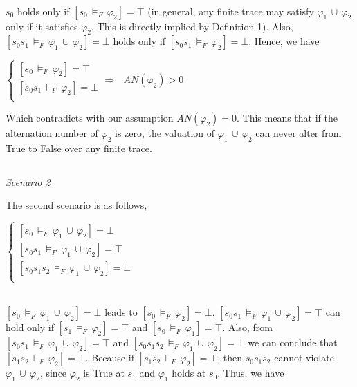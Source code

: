 ~~
  
$s_0$ holds only if $[s_0 \, \models_F \, \varphi_2] = \top$ (in general, any finite trace may satisfy $\varphi_1 \, \cup \, \varphi_2$ only if it satisfies $\varphi_2$. This is directly implied by Definition 1).  Also, $[s_0 s_1 \, \models_F \,  \varphi_1 \, \cup \, \varphi_2] = \bot$ holds only if $[s_0 s_1 \, \models_F \, \varphi_2] = \bot$. Hence, we have  
~~~
 \begin{center}
$
  \left.
  \begin{cases}
    [s_0 \, \models_F \, \varphi_2] = \top \\
    [s_0 s_1 \, \models_F \, \varphi_2] = \bot \\
  \end{cases}
  \right. 
\Longrightarrow     ~~~   AN(\varphi_2) > 0
$
\end{center}
  
  Which contradicts with our assumption $AN(\varphi_2) = 0$. This means that if the alternation number of $\varphi_2$ is zero, the valuation of $\varphi_1 \, \cup \, \varphi_2$ can never alter from True to False over any finite trace. 


\subsection*{}

\textit{Scenario 2}

The second scenario is as follows,
~~~
 \begin{center}
 
$  \left.
  \begin{cases}
    [s_0 \, \models_F \, \varphi_1 \, \cup \, \varphi_2] = \bot \\
    [s_0 s_1 \, \models_F \, \varphi_1 \, \cup \, \varphi_2] = \top \\
    [s_0 s_1 s_2\, \models_F \, \varphi_1 \, \cup \, \varphi_2] = \bot \\
  \end{cases}
  \right.
  $
\end{center}
~~~ \\
 $[s_0 \, \models_F \, \varphi_1 \, \cup \, \varphi_2] = \bot$ leads to $ [s_0 \, \models_F \, \varphi_2] = \bot $. 
 $[s_0 s_1 \, \models_F \, \varphi_1 \, \cup \, \varphi_2] = \top$ can hold only if $ [s_1 \, \models_F \, \varphi_2] = \top $ and $ [s_0 \, \models_F \, \varphi_1] = \top$. 
Also, from $ [s_0 s_1 \, \models_F \, \varphi_1 \, \cup \, \varphi_2] = \top$ and $ [s_0 s_1 s_2\, \models_F \, \varphi_1 \, \cup \, \varphi_2] = \bot $ we can conclude that $[s_1 s_2\, \models_F \, \varphi_2] = \bot$. Because if $[s_1 s_2\, \models_F \, \varphi_2] = \top$, then $s_0s_1s_2$ cannot violate $\varphi_1 \, \cup \, \varphi_2$, since $\varphi_2$ is True at $s_1$ and $\varphi_1$ holds at $s_0$. Thus, we have

